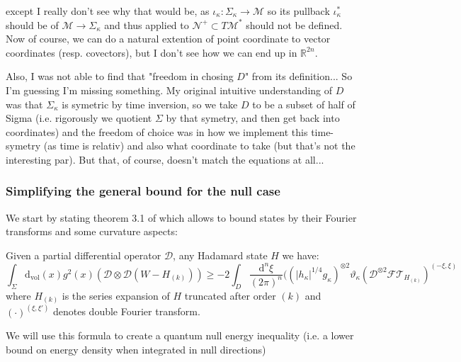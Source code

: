 \documentclass[a4paper,11pt]{article}
\numberwithin{equation}{section}
\theoremstyle{definition}
\renewcommand{\d}{{\mathrm{d}}}
\begin{document}
\color{red} except I really don't see why that would be, as $\iota_\kappa: \Sigma_\kappa \to \mathcal{M}$ so its pullback $\iota_\kappa^*$ should be of $\mathcal{M}\to \Sigma_\kappa$ and thus applied to $\mathcal{N}^+ \subset T\mathcal{M}^*$ should not be defined. Now of course, we can do a natural extention of point coordinate to vector coordinates (resp. covectors), but I don't see how we can end up in $\mathbb{R}^{2n}$.

Also, I was not able to find that "freedom in chosing $D$" from its definition... So I'm guessing I'm missing something. My original intuitive understanding of $D$ was that $\Sigma_\kappa$ is symetric by time inversion, so we take $D$ to be a subset of half of Sigma (i.e. rigorously we quotient  $\Sigma$ by that symetry, and then get back into coordinates) and the freedom of choice was in how we implement this time-symetry (as time is relativ) and also what coordinate to take (but that's not the interesting par). But that, of course, doesn't match the equations at all... \color{black}




\subsubsection{Simplifying the general bound for the null case}
We start by stating theorem 3.1 of \cite{FourBound} which allows to bound states by their Fourier transforms and some curvature aspects:

Given a partial differential operator $\mathcal{D}$, any Hadamard state $H$ we have:
\begin{equation}\label{3.1}
    \int_\Sigma \d_\mathrm{vol}(x) g^2(x) (\mathcal{D}\otimes\mathcal{D}(W-H_{(k)}))\geq -2\int_D\frac{\d^n\xi}{(2\pi)^n}((|h_\kappa|^{1/4}g_\kappa)^{\otimes 2}\vartheta_\kappa(\mathcal{D}^{\otimes2}\mathcal{FT}_{H_{(k)}})^{(-\xi,\xi)}
\end{equation}
where $H_(k)$ is the series expansion of $H$ truncated after order $(k)$ and $(\cdot)^{(\xi,\xi')}$ denotes double Fourier transform.

We will use this formula to create a quantum null energy inequality (i.e. a lower bound on energy density when integrated in null directions)
\end{document}
